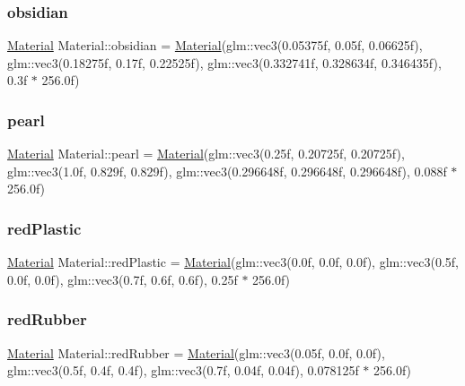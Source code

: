 \subsubsection{\texorpdfstring{obsidian}{obsidian}}
{\footnotesize\ttfamily \mbox{\hyperlink{struct_material}{Material}} Material\+::obsidian = \mbox{\hyperlink{struct_material}{Material}}(glm\+::vec3(0.\+05375f, 0.\+05f, 0.\+06625f), glm\+::vec3(0.\+18275f, 0.\+17f, 0.\+22525f), glm\+::vec3(0.\+332741f, 0.\+328634f, 0.\+346435f), 0.\+3f $\ast$ 256.\+0f)\hspace{0.3cm}{\ttfamily [static]}}

\mbox{\label{struct_material_af1eb6afe67d69a7992ac7bfd31c76173}} 
\subsubsection{\texorpdfstring{pearl}{pearl}}
{\footnotesize\ttfamily \mbox{\hyperlink{struct_material}{Material}} Material\+::pearl = \mbox{\hyperlink{struct_material}{Material}}(glm\+::vec3(0.\+25f, 0.\+20725f, 0.\+20725f), glm\+::vec3(1.\+0f, 0.\+829f, 0.\+829f), glm\+::vec3(0.\+296648f, 0.\+296648f, 0.\+296648f), 0.\+088f $\ast$ 256.\+0f)\hspace{0.3cm}{\ttfamily [static]}}

\mbox{\label{struct_material_a343f9c5d998f1db5ba50ef40376b09fe}} 
\subsubsection{\texorpdfstring{redPlastic}{redPlastic}}
{\footnotesize\ttfamily \mbox{\hyperlink{struct_material}{Material}} Material\+::red\+Plastic = \mbox{\hyperlink{struct_material}{Material}}(glm\+::vec3(0.\+0f, 0.\+0f, 0.\+0f), glm\+::vec3(0.\+5f, 0.\+0f, 0.\+0f), glm\+::vec3(0.\+7f, 0.\+6f, 0.\+6f), 0.\+25f $\ast$ 256.\+0f)\hspace{0.3cm}{\ttfamily [static]}}

\mbox{\label{struct_material_a5e1b659445c024a24237731f7d35aa52}} 
\subsubsection{\texorpdfstring{redRubber}{redRubber}}
{\footnotesize\ttfamily \mbox{\hyperlink{struct_material}{Material}} Material\+::red\+Rubber = \mbox{\hyperlink{struct_material}{Material}}(glm\+::vec3(0.\+05f, 0.\+0f, 0.\+0f), glm\+::vec3(0.\+5f, 0.\+4f, 0.\+4f), glm\+::vec3(0.\+7f, 0.\+04f, 0.\+04f), 0.\+078125f $\ast$ 256.\+0f)\hspace{0.3cm}{\ttfamily [static]}}


